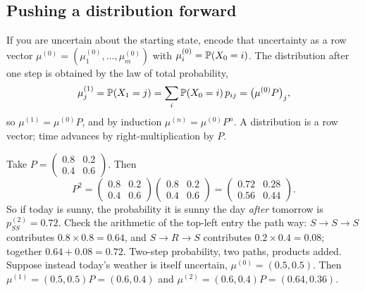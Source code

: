 \subsection{Pushing a distribution forward}

If you are uncertain about the starting state, encode that uncertainty as a row vector
$\mu^{(0)} = (\mu^{(0)}_1, \dots, \mu^{(0)}_m)$ with $\mu^{(0)}_i = \P(X_0 = i)$. The
distribution after one step is obtained by the law of total probability,
\[
  \mu^{(1)}_j = \P(X_1 = j) = \sum_i \P(X_0 = i)\,p_{ij} = \big(\mu^{(0)} P\big)_j,
\]
so $\mu^{(1)} = \mu^{(0)} P$, and by induction $\mu^{(n)} = \mu^{(0)} P^n$. A distribution is a
row vector; time advances by right-multiplication by $P$.

\begin{example}
\label{ch23:ex-weather-twostep}
Take $P = \left(\begin{smallmatrix} 0.8 & 0.2 \\ 0.4 & 0.6 \end{smallmatrix}\right)$. Then
\[
  P^2 = \begin{pmatrix} 0.8 & 0.2 \\ 0.4 & 0.6 \end{pmatrix}
        \begin{pmatrix} 0.8 & 0.2 \\ 0.4 & 0.6 \end{pmatrix}
      = \begin{pmatrix} 0.72 & 0.28 \\ 0.56 & 0.44 \end{pmatrix}.
\]
So if today is sunny, the probability it is sunny the day \emph{after} tomorrow is
$p_{SS}^{(2)} = 0.72$. Check the arithmetic of the top-left entry the path way: $S \to S \to
S$ contributes $0.8 \times 0.8 = 0.64$, and $S \to R \to S$ contributes $0.2 \times 0.4 =
0.08$; together $0.64 + 0.08 = 0.72$. Two-step probability, two paths, products added.
Suppose instead today's weather is itself uncertain, $\mu^{(0)} = (0.5, 0.5)$. Then
$\mu^{(1)} = (0.5,0.5)P = (0.6, 0.4)$ and $\mu^{(2)} = (0.6,0.4)P = (0.64, 0.36)$.
\end{example}

